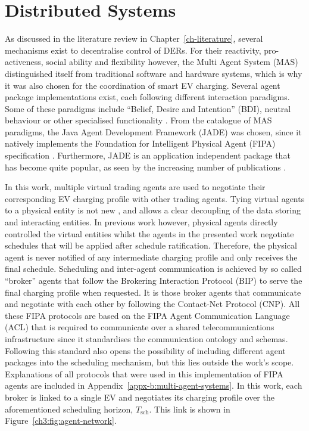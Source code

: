 \section{Distributed Systems}
\label{ch3:sec:distributed-systems}

As discussed in the literature review in Chapter~\ref{ch-literature}, several mechanisms exist to decentralise control of DERs.
For their reactivity, pro-activeness, social ability and flexibility however, the Multi Agent System (MAS) distinguished itself from traditional software and hardware systems, which is why it was also chosen for the coordination of smart EV charging.
Several agent package implementations exist, each following different interaction paradigms.
Some of these paradigms include ``Belief, Desire and Intention'' (BDI), neutral behaviour or other specialised functionality \cite{Luck2004}.
From the catalogue of MAS paradigms, the Java Agent Development Framework (JADE) was chosen, since it natively implements the Foundation for Intelligent Physical Agent (FIPA) specification \cite{JADE-website, FIPA-agent-specs}.
Furthermore, JADE is an application independent package that has become quite popular, as seen by the increasing number of publications \cite{Karfopoulos2013, Eddy2011, Kuo2013, Mocci2014, Li2017}.

In this work, multiple virtual trading agents are used to negotiate their corresponding EV charging profile with other trading agents.
Tying virtual agents to a physical entity is not new \cite{Dimeas2005, Nguyen2011, Nagata2011, Nagata2012}, and allows a clear decoupling of the data storing and interacting entities.
In previous work however, physical agents directly controlled the virtual entities whilst the agents in the presented work negotiate schedules that will be applied after schedule ratification.
Therefore, the physical agent is never notified of any intermediate charging profile and only receives the final schedule.
Scheduling and inter-agent communication is achieved by so called ``broker'' agents that follow the Brokering Interaction Protocol (BIP) to serve the final charging profile when requested.
It is those broker agents that communicate and negotiate with each other by following the Contact-Net Protocol (CNP).
All these FIPA protocols are based on the FIPA Agent Communication Language (ACL) that is required to communicate over a shared telecommunications infrastructure since it standardises the communication ontology and schemas.
Following this standard also opens the possibility of including different agent packages into the scheduling mechanism, but this lies outside the work's scope.
Explanations of all protocols that were used in this implementation of FIPA agents are included in Appendix~\ref{appx-b:multi-agent-systems}.
In this work, each broker is linked to a single EV and negotiates its charging profile over the aforementioned scheduling horizon, $T_\text{sch}$.
This link is shown in Figure~\ref{ch3:fig:agent-network}.

